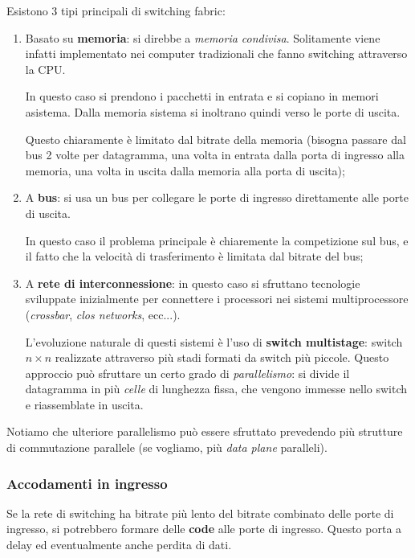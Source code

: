 \documentclass[a4paper,11pt]{article}
\begin{document}
Esistono 3 tipi principali di switching fabric:
\begin{enumerate}
	\item Basato su \textbf{memoria}: si direbbe a \textit{memoria condivisa}. Solitamente viene infatti implementato nei computer tradizionali che fanno switching attraverso la CPU.

		In questo caso si prendono i pacchetti in entrata e si copiano in memori asistema. Dalla memoria sistema si inoltrano quindi verso le porte di uscita.
		
		Questo chiaramente è limitato dal bitrate della memoria (bisogna passare dal bus 2 volte per datagramma, una volta in entrata dalla porta di ingresso alla memoria, una volta in uscita dalla memoria alla porta di uscita);
	\item A \textbf{bus}: si usa un bus per collegare le porte di ingresso direttamente alle porte di uscita. 

		In questo caso il problema principale è chiaremente la competizione sul bus, e il fatto che la velocità di trasferimento è limitata dal bitrate del bus;

	\item A \textbf{rete di interconnessione}: in questo caso si sfruttano tecnologie sviluppate inizialmente per connettere i processori nei sistemi multiprocessore (\textit{crossbar}, \textit{clos networks}, ecc...).

		L'evoluzione naturale di questi sistemi è l'uso di \textbf{switch multistage}: switch $n \times n$ realizzate attraverso più stadi formati da switch più piccole.
		Questo approccio può sfruttare un certo grado di \textit{parallelismo}: si divide il datagramma in più \textit{celle} di lunghezza fissa, che vengono immesse nello switch e riassemblate in uscita.

\end{enumerate}

Notiamo che ulteriore parallelismo può essere sfruttato prevedendo più strutture di commutazione parallele (se vogliamo, più \textit{data plane} paralleli).

\subsubsection{Accodamenti in ingresso}
Se la rete di switching ha bitrate più lento del bitrate combinato delle porte di ingresso, si potrebbero formare delle \textbf{code} alle porte di ingresso. Questo porta a delay ed eventualmente anche perdita di dati.
\end{document}
